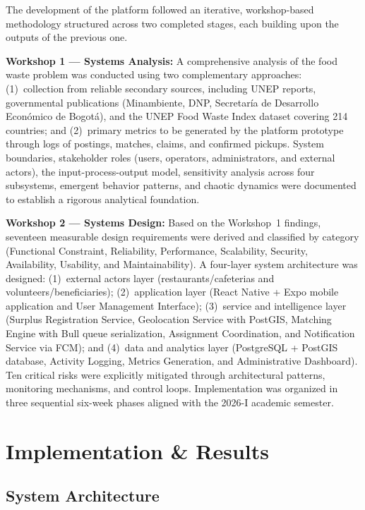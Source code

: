 \documentclass[conference]{IEEEtran}
\begin{document}
The development of the platform followed an iterative, workshop-based methodology structured across two completed stages, each building upon the outputs of the previous one.

\textbf{Workshop 1 --- Systems Analysis:} A comprehensive analysis of the food waste problem was conducted using two complementary approaches: (1)~collection from reliable secondary sources, including UNEP reports, governmental publications (Minambiente, DNP, Secretaría de Desarrollo Económico de Bogotá), and the UNEP Food Waste Index dataset covering 214 countries; and (2)~primary metrics to be generated by the platform prototype through logs of postings, matches, claims, and confirmed pickups. System boundaries, stakeholder roles (users, operators, administrators, and external actors), the input-process-output model, sensitivity analysis across four subsystems, emergent behavior patterns, and chaotic dynamics were documented to establish a rigorous analytical foundation.

\textbf{Workshop 2 --- Systems Design:} Based on the Workshop~1 findings, seventeen measurable design requirements were derived and classified by category (Functional Constraint, Reliability, Performance, Scalability, Security, Availability, Usability, and Maintainability). A four-layer system architecture was designed: (1)~external actors layer (restaurants/cafeterias and volunteers/beneficiaries); (2)~application layer (React Native + Expo mobile application and User Management Interface); (3)~service and intelligence layer (Surplus Registration Service, Geolocation Service with PostGIS, Matching Engine with Bull queue serialization, Assignment Coordination, and Notification Service via FCM); and (4)~data and analytics layer (PostgreSQL + PostGIS database, Activity Logging, Metrics Generation, and Administrative Dashboard). Ten critical risks were explicitly mitigated through architectural patterns, monitoring mechanisms, and control loops. Implementation was organized in three sequential six-week phases aligned with the 2026-I academic semester.

\section{Implementation \& Results}

\subsection{System Architecture}
\end{document}
